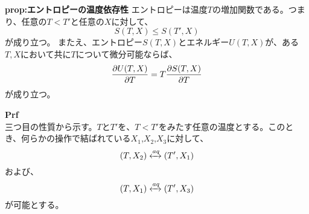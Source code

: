 \documentclass[a4paper,11pt]{jsarticle}
\begin{document}
\begin{itembox}[l]{\textbf{prop:エントロピーの温度依存性}}
エントロピーは温度$T$の増加関数である。つまり、任意の$T<T'$と任意の$X$に対して、
\begin{equation}
    S(T,X) \leq S(T',X)
\end{equation}
が成り立つ。
またえ、エントロピー$S(T,X)$とエネルギー$U(T,X)$が、ある$T,X$において共に$T$について微分可能ならば、
\begin{equation}
    \pdv{U(T,X)}{T} = T\pdv{S(T,X)}{T}
\end{equation}
が成り立つ。
\end{itembox}
\textbf{Prf}\\
三つ目の性質から示す。$T$と$T'$を、$T < T'$をみたす任意の温度とする。このとき、何らかの操作で結ばれている$X_1$,$X_2$,$X_3$に対して、
\begin{equation}
    (T,X_2) \xleftrightarrow{aq} (T',X_1)
\end{equation}
および、
\begin{equation}
    (T,X_1) \xleftrightarrow{aq} (T',X_3)
\end{equation}
が可能とする。
\end{document}
